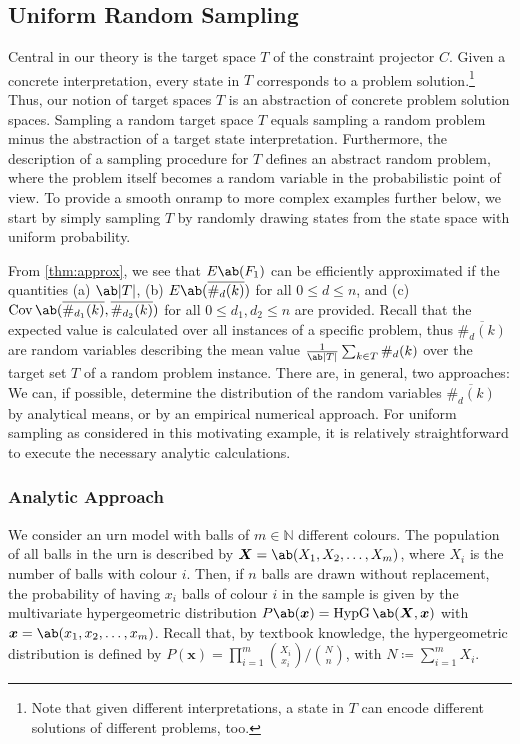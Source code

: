\subsection{Uniform Random Sampling}
\label{sec:uniform_sampled}
Central in our theory is the target space $T$ of the constraint projector $C$. Given a concrete interpretation, every state in $T$ corresponds to a problem solution.\footnote{Note that given different interpretations, a state in $T$ can encode different solutions of different problems, too.} Thus, our notion of target spaces $T$ is an abstraction of concrete problem solution spaces. Sampling a random target space $T$ equals sampling a random problem minus the abstraction of a target state interpretation. Furthermore, the description of a sampling procedure for $T$ defines an abstract random problem, where the problem itself becomes a random variable in the probabilistic point of view. To provide a smooth onramp to more complex examples further below, we start by simply sampling $T$ by randomly drawing states from the state space with uniform probability.  

From \cref{thm:approx}, we see that $E\ab(F_1)$ can be efficiently approximated if the quantities (a) $\ab|T|$, (b) $E\ab(\overline{\#_d (k)})$ for all $0 \leq d \leq n$, and (c) $\Cov \ab(\overline{\#_{d_1} (k)}, \overline{\#_{d_2} (k)})$ for all $0 \leq d_1, d_2 \leq n$ are provided. Recall that the expected value is calculated over all instances of a specific problem, thus $\overline{\#_d (k)}$ are random variables describing the mean value $\frac{1}{\ab|T|} \sum_{k \in T} \#_d(k)$ over the target set $T$ of a random problem instance. There are, in general, two approaches: 
We can, if possible, determine the distribution of the random variables $\overline{\#_d (k)}$
by analytical means, or by an empirical
numerical approach. For uniform sampling as considered in this
motivating example, it is relatively straightforward to execute
the necessary analytic calculations. 

\subsubsection{Analytic Approach}
\begin{definition}
    We consider an urn model with balls of $m \in \mathds{N}$ different colours. The population of all balls in the urn is described by $\bm{X} = \ab(X_1, X_2, \dots, X_m)$, where $X_i$ is the number of balls with colour $i$. Then, if $n$ balls are drawn without replacement, the probability of having $x_i$ balls of colour $i$ in the sample is given by the 
    multivariate hypergeometric distribution
%
    \(P\ab(\bm{x}) = \hypgeom \ab(\bm{X}, \bm{x})\)
    with $\bm{x} = \ab(x_1, x_2, \dots, x_m)$. Recall that, by textbook knowledge, the hypergeometric distribution is defined by 
    \(P(\bm{x}) = \prod_{i=1}^m \binom{X_i}{x_i}/\binom{N}{n}\),
         with \(N \coloneqq \sum_{i=1}^m X_i\).
\end{definition}


